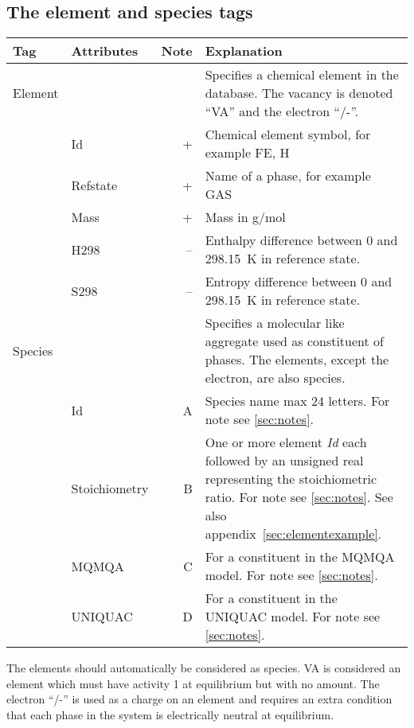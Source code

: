 \documentclass{article}
\begin{document}
\newpage

\subsection{The element and species tags}

\bigskip
\begin{tabular}{|p{} p{} r p{}|}\hline
  Tag & Attributes & Note & Explanation\\\hline

  Element & && Specifies a chemical element in the database.  The vacancy is denoted ``VA'' and the electron ``/-''.\\
          & Id        & +    & Chemical element symbol, for example FE, H \\
          & Refstate  & +    & Name of a phase, for example GAS \\
          & Mass      & +    & Mass in g/mol\\
          & H298      & --    & Enthalpy difference between 0 and 298.15~K in reference state.\\
          & S298      & --    & Entropy difference between 0 and 298.15~K in reference state.\\\hline

  Species & && Specifies a molecular like aggregate used as constituent of phases.  The elements, except the electron, are also species.\\
          & Id        & A & Species name max 24 letters. For note see \ref{sec:notes}.\\
          & Stoichiometry & B & One or more element {\em Id} each followed by an unsigned real representing the stoichiometric ratio.  For note see \ref{sec:notes}.  See also appendix~\ref{sec:elementexample}.\\
          & MQMQA & C & For a constituent in the MQMQA model.  For note see \ref{sec:notes}.\\
          & UNIQUAC & D & For a constituent in the UNIQUAC model.  For note see \ref{sec:notes}.\\\hline

\end{tabular}

\bigskip

The elements should automatically be considered as species.  VA is
considered an element which must have activity 1 at equilibrium but
with no amount.  The electron ``/-'' is used as a charge on an element
and requires an extra condition that each phase in the system is
electrically neutral at equilibrium.
\end{document}

